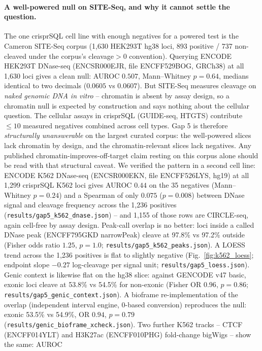 \documentclass[12pt]{article}
\begin{document}
\paragraph{A well-powered null on SITE-Seq, and why it cannot settle the
question.} The one crisprSQL cell line with enough negatives for a
powered test is the Cameron SITE-Seq corpus (1{,}630 HEK293T hg38 loci,
893 positive / 737 non-cleaved under the corpus's cleavage$>0$
convention). Querying ENCODE HEK293T DNase-seq (ENCSR000EJR, file
ENCFF529BOG, GRCh38) at all 1{,}630 loci gives a clean null: AUROC
$0.507$, Mann--Whitney $p=0.64$, medians identical to two decimals
($0.0605$ vs $0.0607$). But SITE-Seq measures cleavage on \emph{naked
genomic DNA in vitro} -- chromatin is absent by assay design, so a
chromatin null is expected by construction and says nothing about the
cellular question. The cellular assays in crisprSQL (GUIDE-seq, HTGTS)
contribute $\leq 10$ measured negatives combined across cell types. Gap 5
is therefore \emph{structurally unanswerable} on the largest curated
corpus: the well-powered slices lack chromatin by design, and the
chromatin-relevant slices lack negatives. Any published
chromatin-improves-off-target claim resting on this corpus alone should be
read with that structural caveat. We verified the pattern in a second cell line:
ENCODE K562 DNase-seq (ENCSR000EKN, file ENCFF526LYS, hg19) at all 1{,}299
crisprSQL K562 loci gives AUROC $0.44$ on the 35 negatives
(Mann--Whitney $p=0.24$) and a Spearman of only $0.075$ ($p=0.008$)
between DNase signal and cleavage frequency across the 1{,}236 positives
(\texttt{results/gap5\_k562\_dnase.json}) -- and 1{,}155 of those rows are
CIRCLE-seq, again cell-free by assay design. Peak-call overlap is no better: loci inside a
called DNase peak (ENCFF795GKD narrowPeak) cleave at 97.8\% vs 97.2\%
outside (Fisher odds ratio $1.25$, $p=1.0$;
\texttt{results/gap5\_k562\_peaks.json}). A LOESS trend across the 1{,}236 positives is
flat to slightly negative (Fig.~\ref{fig:k562_loess}; endpoint slope
$-0.27$ log-cleavage per signal unit;
\texttt{results/gap5\_loess.json}). Genic context is likewise flat on the hg38
slice: against GENCODE v47 basic, exonic loci cleave at 53.8\% vs
54.5\% for non-exonic (Fisher OR $0.96$, $p=0.86$;
\texttt{results/gap5\_genic\_context.json}). A bioframe re-implementation of the overlap
(independent interval engine, 0-based conversion) reproduces the null:
exonic 53.5\% vs 54.9\%, OR $0.94$, $p=0.79$
(\texttt{results/genic\_bioframe\_xcheck.json}). Two further K562 tracks -- CTCF (ENCFF014YLT) and
H3K27ac (ENCFF010PHG) fold-change bigWigs -- show the same: AUROC
\end{document}
